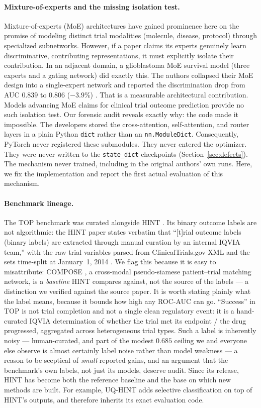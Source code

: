 \documentclass[a4paper,fleqn]{cas-sc}
\begin{document}
\paragraph{Mixture-of-experts and the missing isolation test.} Mixture-of-experts (MoE) architectures have gained prominence here on the promise of modeling distinct trial modalities (molecule, disease, protocol) through specialized subnetworks. However, if a paper claims its experts genuinely learn discriminative, contributing representations, it must explicitly isolate their contribution. In an adjacent domain, a glioblastoma MoE survival model (three experts and a gating network) did exactly this. The authors collapsed their MoE design into a single-expert network and reported the discrimination drop from AUC $0.839$ to $0.806$ ($-3.9\%$) \citep{reyes2026therapeutic}. That is a measurable architectural contribution. Models advancing MoE claims for clinical trial outcome prediction provide no such isolation test. Our forensic audit reveals exactly why: the code made it impossible. The developers stored the cross-attention, self-attention, and router layers in a plain Python \texttt{dict} rather than an \texttt{nn.ModuleDict}. Consequently, PyTorch never registered these submodules. They never entered the optimizer. They were never written to the \texttt{state\_dict} checkpoints (Section~\ref{sec:defects}). The mechanism never trained, including in the original authors' own runs. Here, we fix the implementation and report the first actual evaluation of this mechanism.
\paragraph{Benchmark lineage.} The TOP benchmark was curated alongside HINT \citep{fu2022hint}. Its binary outcome labels are not algorithmic: the HINT paper states verbatim that ``[t]rial outcome labels (binary labels) are extracted through manual curation by an internal IQVIA team,'' with the raw trial variables parsed from ClinicalTrials.gov XML and the sets time-split at January~1, 2014 \citep{fu2022hint}. We flag this because it is easy to misattribute: COMPOSE \citep{gao2020compose}, a cross-modal pseudo-siamese patient--trial matching network, is a \emph{baseline} HINT compares against, not the source of the labels --- a distinction we verified against the source paper. It is worth stating plainly what the label means, because it bounds how high any ROC-AUC can go. ``Success'' in TOP is not trial completion and not a single clean regulatory event: it is a hand-curated IQVIA determination of whether the trial met its endpoint / the drug progressed, aggregated across heterogeneous trial types. Such a label is inherently noisy --- human-curated, and part of the modest $0.685$ ceiling we and everyone else observe is almost certainly label noise rather than model weakness --- a reason to be sceptical of \emph{small} reported gains, and an argument that the benchmark's own labels, not just its models, deserve audit. Since its release, HINT has become both the reference baseline \citep{zhang2025mexactp} and the base on which new methods are built. For example, UQ-HINT \citep{chen2024uq} adds selective classification on top of HINT's outputs, and therefore inherits its exact evaluation code.
\end{document}
